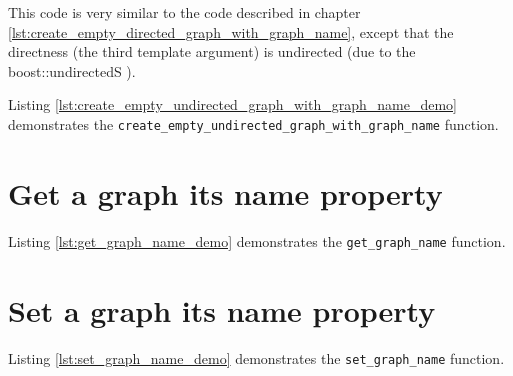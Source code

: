 

This code is very similar to the code described in chapter 
\ref{lst:create_empty_directed_graph_with_graph_name}, 
except that the directness (the third template argument) is undirected
(due to the boost::undirectedS ).

Listing \ref{lst:create_empty_undirected_graph_with_graph_name_demo}
demonstrates the \verb;create_empty_undirected_graph_with_graph_name; function.



\section{Get a graph its name property}
\label{subsec:get_graph_name}



Listing \ref{lst:get_graph_name_demo}
demonstrates the \verb;get_graph_name; function.



\section{Set a graph its name property}
\label{subsec:set_graph_name}



Listing \ref{lst:set_graph_name_demo}
 demonstrates the \verb;set_graph_name; function.

